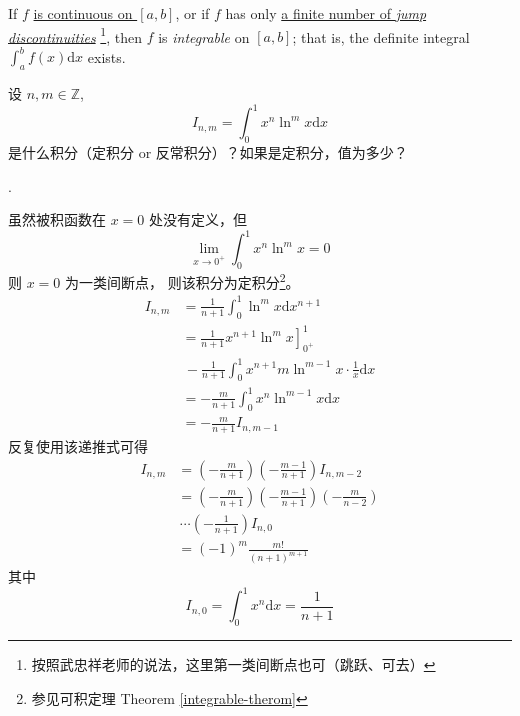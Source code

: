 \begin{theorem} \label{integrable-therom}
    If $f$ \underline{is continuous on $[a,b]$},
    or if $f$ has only 
    \underline{a finite number of \textit{jump discontinuities}}
    \footnote{按照武忠祥老师的说法，这里第一类间断点也可（跳跃、可去）}, 
    then $f$ is \emph{integrable} on $[a, b]$;
    that is, the definite integral $\int_a^b f(x) \mathrm{d} x$ exists.
\end{theorem}

\begin{example}
    设 $n, m \in \mathbb Z$, 
    \[
        I_{n, m} = \int_0^1 x^n \ln^m x \mathrm dx
    \]
    是什么积分（定积分 or 反常积分）？如果是定积分，值为多少？

    \cite[question 190]{w660}.

    虽然被积函数在 $x = 0$ 处没有定义，但
    \[
        \lim_{x \to 0^+} \int_0^1 x^n \ln^m x = 0
    \]
    则 $x = 0$ 为一类间断点，
    则该积分为定积分\footnote{参见可积定理 Theorem \ref{integrable-therom}}。
    \begin{align*}
        I_{n, m} &= \frac{1}{n+1} \int_0^1 \ln^m x \mathrm d x^{n+1} \\
                 &= \left.\frac{1}{n+1} x^{n+1} \ln^m x \right]_{0^+}^1 \\
                 &{\,}- \frac{1}{n+1} \int_0^1 x^{n+1} m \ln^{m - 1} x \cdot \frac{1}{x} \mathrm dx\\
                 &= -\frac{m}{n+1} \int_0^1 x^n \ln^{m-1} x \mathrm dx \\
                 &= -\frac{m}{n+1} I_{n, m - 1}
    \end{align*}
    反复使用该递推式可得
    \begin{align*}
        I_{n, m} &= 
                    \left(-\frac{m}{n+1}\right)
                    \left(-\frac{m-1}{n+1}\right) I_{n, m-2}\\
                 &= 
                    \left(-\frac{m}{n+1}\right)
                    \left(-\frac{m-1}{n+1}\right) 
                    \left(-\frac{m}{n-2}\right) \\
                 &{\,}\cdots
                    \left(-\frac{1}{n+1}\right) 
                    I_{n, 0}\\
                 &= (-1)^m \frac{m!}{(n+1)^{m+1}}
    \end{align*}
    其中
    \[
        I_{n, 0} = \int_0^1 x^n \mathrm dx = \frac{1}{n+1}
    \]
\end{example}

